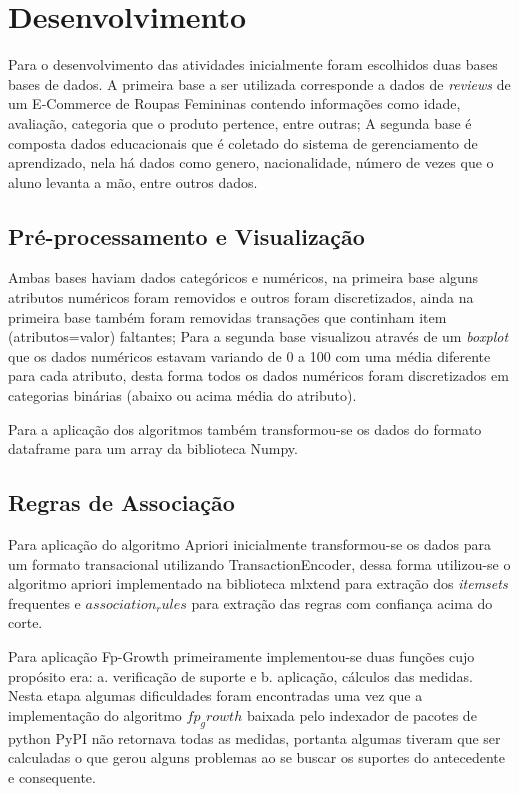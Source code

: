 \chapter{Desenvolvimento}\label{cap_desenv}

Para o desenvolvimento das atividades inicialmente foram escolhidos duas bases bases de dados. A primeira base a ser utilizada corresponde a dados de \textit{reviews} de um E-Commerce de Roupas Femininas contendo informações como idade, avaliação, categoria que o produto pertence, entre outras; A segunda base é composta dados educacionais que é coletado do sistema de gerenciamento de aprendizado, nela há dados como genero, nacionalidade, número de vezes que o aluno levanta a mão, entre outros dados.

\section{Pré-processamento e Visualização}
Ambas bases haviam dados categóricos e numéricos, na primeira base alguns atributos numéricos foram removidos e outros foram discretizados, ainda na primeira base também foram removidas transações que continham item (atributos=valor) faltantes; Para a segunda base visualizou através de um \textit{boxplot} que os dados numéricos estavam variando de 0 a 100 com uma média diferente para cada atributo, desta forma todos os dados numéricos foram discretizados em categorias binárias (abaixo ou acima média do atributo).

Para a aplicação dos algoritmos também transformou-se os dados do formato dataframe para um array da biblioteca Numpy.

\section{Regras de Associação}

Para aplicação do algoritmo Apriori inicialmente transformou-se os dados para um formato transacional utilizando TransactionEncoder, dessa forma utilizou-se o algoritmo apriori implementado na biblioteca mlxtend para extração dos \textit{itemsets} frequentes e $association_rules$ para extração das regras com confiança acima do corte.

Para aplicação Fp-Growth primeiramente implementou-se duas funções cujo propósito era: a. verificação de suporte e b. aplicação, cálculos das medidas. Nesta etapa algumas dificuldades foram encontradas uma vez que a implementação do algoritmo $fp_growth$ baixada pelo indexador de pacotes de python PyPI não retornava todas as medidas, portanta algumas tiveram que ser calculadas o que gerou alguns problemas ao se buscar os suportes do antecedente e consequente.

